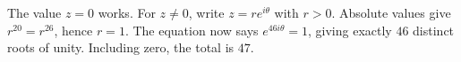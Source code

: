The value $z=0$ works. For $z\ne0$, write $z=re^{i\theta}$ with $r>0$. Absolute values give $r^{20}=r^{26}$, hence $r=1$. The equation now says $e^{46i\theta}=1$, giving exactly $46$ distinct roots of unity. Including zero, the total is $\boxed{47}$.
